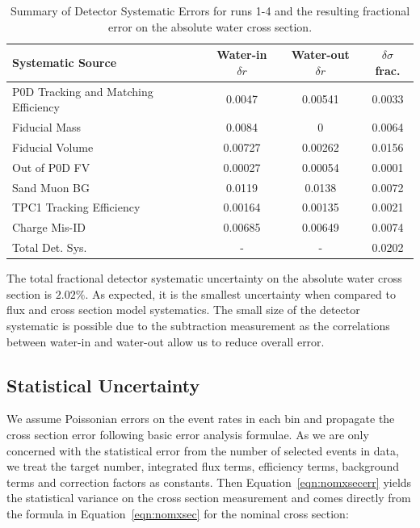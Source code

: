 \begin{table}[h]
\caption{Summary of Detector Systematic Errors for runs 1-4 and the resulting fractional error on the absolute water cross section.}
\centering
\begin{tabular}{lccc}\toprule\midrule
\renewcommand{\arraystretch}{1.1}
Systematic Source & Water-in $\delta r$  & Water-out $\delta r$ & $\delta\sigma$ frac.
\\ \midrule
P0D Tracking and Matching Efficiency & 0.0047 & 0.00541 & 0.0033\\
\midrule
Fiducial Mass & 0.0084 & 0 & 0.0064\\
\midrule
Fiducial Volume & 0.00727 & 0.00262 & 0.0156\\
\midrule
Out of P0D FV & 0.00027 & 0.00054 & 0.0001\\
\midrule
Sand Muon BG & 0.0119 & 0.0138 & 0.0072\\
\midrule
TPC1 Tracking Efficiency & 0.00164 & 0.00135 & 0.0021\\
\midrule
Charge Mis-ID & 0.00685  & 0.00649 & 0.0074\\
\midrule
\midrule
Total Det. Sys. &  - & - & 0.0202  \\
\midrule
\bottomrule
\end{tabular}
\label{tab:detsys}
\end{table}

The total fractional detector systematic uncertainty on the absolute water cross section is $2.02\%$. As expected, it is the smallest uncertainty when compared to flux and cross section model systematics. The small size of the detector systematic is possible due to the subtraction measurement as the correlations between water-in and water-out allow us to reduce overall error.

\subsection{Statistical Uncertainty}

We assume Poissonian errors on the event rates in each bin and propagate the cross section error following basic error analysis formulae. As we are only concerned with the statistical error from the number of selected events in data, we treat the target number, integrated flux terms, efficiency terms, background terms and correction factors as constants. Then Equation~\ref{eqn:nomxsecerr} yields the statistical variance on the cross section measurement and comes directly from the formula in Equation~\ref{eqn:nomxsec} for the nominal cross section:

